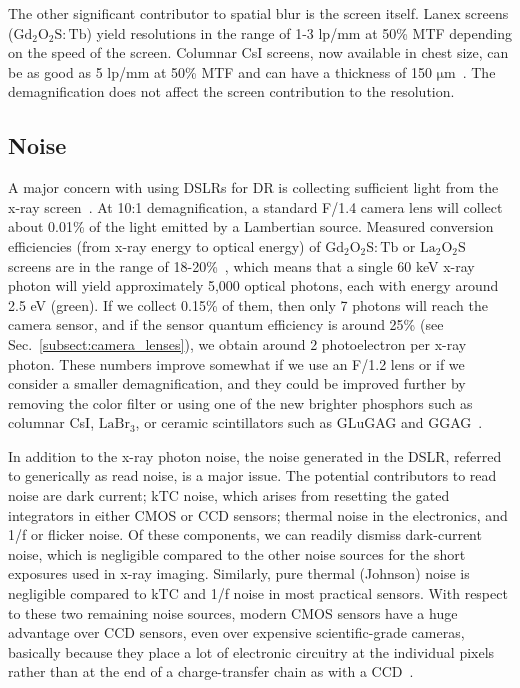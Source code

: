 The other significant contributor to spatial blur is the screen itself. Lanex screens ($\mathrm{Gd_2O_2S:Tb}$) yield resolutions in the range of 1-3 lp/mm at 50\% MTF depending on the speed of the screen. Columnar CsI screens, now available in chest size, can be as good as 5 lp/mm at 50\% MTF and can have a thickness of 150 $\mathrm{\mu m}$~\citep{Nagarkar1997}. The demagnification does not affect the screen contribution to the resolution.

\subsection{Noise}
\label{subsect:noise}
A major concern with using DSLRs for DR is collecting sufficient light from the x-ray screen~\citep{Hejazi1997}. At 10:1 demagnification, a standard F/1.4 camera lens will collect about 0.01\% of the light emitted by a Lambertian source. Measured conversion efficiencies (from x-ray energy to optical energy) of $\mathrm{Gd_2O_2S:Tb}$ or $\mathrm{La_2O_2S}$ screens are in the range of 18-20\%~\citep{Kandarakis2001}, which means that a single 60 keV x-ray photon will yield approximately 5,000 optical photons, each with energy around 2.5 eV (green). If we collect 0.15\% of them, then only 7 photons will reach the camera sensor, and if the sensor quantum efficiency is around 25\% (see Sec.~\ref{subsect:camera_lenses}), we obtain around 2 photoelectron per x-ray photon. These numbers improve somewhat if we use an F/1.2 lens or if we consider a smaller demagnification, and they could be improved further by removing the color filter or using one of the new brighter phosphors such as columnar CsI, $\mathrm{LaBr_3}$, or ceramic scintillators such as GLuGAG and GGAG~\citep{Wang2012, Cherepy2009}.

In addition to the x-ray photon noise, the noise generated in the DSLR, referred to generically as read noise, is a major issue. The potential contributors to read noise are dark current; kTC noise, which arises from resetting the gated integrators in either CMOS or CCD sensors; thermal noise in the electronics, and 1/f or flicker noise. Of these components, we can readily dismiss dark-current noise, which is negligible compared to the other noise sources for the short exposures used in x-ray imaging. Similarly, pure thermal (Johnson) noise is negligible compared to kTC and 1/f noise in most practical sensors. With respect to these two remaining noise sources, modern CMOS sensors have a huge advantage over CCD sensors, even over expensive scientific-grade cameras, basically because they place a lot of electronic circuitry at the individual pixels rather than at the end of a charge-transfer chain as with a CCD~\citep{Magnan2003}.


